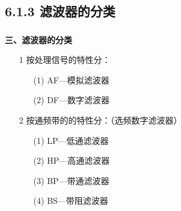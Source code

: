 \documentclass[notheorems,compress,mathserif,table]{beamer}
\begin{document}
\subsection{6.1.3 滤波器的分类}
\begin{frame}[shrink]\frametitle{}%
\textbf{\heiti 三、滤波器的分类}

\begin{enumerate}
  \item[1]
     按处理信号的特性分：
      \begin{enumerate}
        \item [(1)] AF—模拟滤波器
        \item [(2)] DF—数字滤波器
      \end{enumerate}
      \par\quad%
  \item[2]
       按通频带的的特性分：（选频数字滤波器）
      \begin{enumerate}
        \item [(1)] LP—低通滤波器
        \item [(2)] HP—高通滤波器
        \item [(3)] BP—带通滤波器
        \item [(4)] BS—带阻滤波器
      \end{enumerate}
\end{enumerate}
\end{frame}
\end{document}
